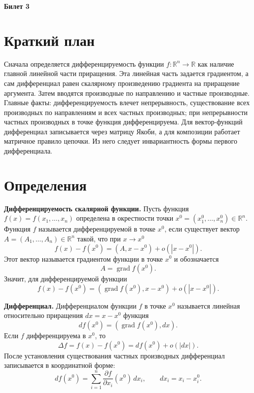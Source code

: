 \documentclass[12pt,a4paper]{article}
\newcommand{\R}{\mathbb{R}}
\newcommand{\grad}{\operatorname{grad}}
\begin{document}
\begin{center}
{\Large\bfseries Билет 3}
\end{center}

\noindent{}

\section*{Краткий план}

Сначала определяется дифференцируемость функции \(f:\R^n\to\R\) как наличие
главной линейной части приращения. Эта линейная часть задается градиентом, а
сам дифференциал равен скалярному произведению градиента на приращение
аргумента. Затем вводятся производные по направлению и частные производные.
Главные факты: дифференцируемость влечет непрерывность, существование всех
производных по направлениям и всех частных производных; при непрерывности
частных производных в точке функция дифференцируема. Для вектор-функций
дифференциал записывается через матрицу Якоби, а для композиции работает
матричное правило цепочки. Из него следует инвариантность формы первого
дифференциала.

\section*{Определения}

\textbf{Дифференцируемость скалярной функции.}
Пусть функция \(f(x)=f(x_1,\dots,x_n)\) определена в окрестности точки
\(x^0=(x^0_1,\dots,x^0_n)\in\R^n\). Функция \(f\) называется
дифференцируемой в точке \(x^0\), если существует вектор
\(A=(A_1,\dots,A_n)\in\R^n\) такой, что при \(x\to x^0\)
\[
  f(x)-f(x^0)=(A,x-x^0)+o(|x-x^0|).
\]
Этот вектор называется градиентом функции в точке \(x^0\) и обозначается
\[
  A=\grad f(x^0).
\]
Значит, для дифференцируемой функции
\[
  f(x)-f(x^0)=(\grad f(x^0),x-x^0)+o(|x-x^0|).
\]

\textbf{Дифференциал.}
Дифференциалом функции \(f\) в точке \(x^0\) называется линейная относительно
приращения \(dx=x-x^0\) функция
\[
  df(x^0)=(\grad f(x^0),dx).
\]
Если \(f\) дифференцируема в \(x^0\), то
\[
  \Delta f=f(x)-f(x^0)=df(x^0)+o(|dx|).
\]
После установления существования частных производных дифференциал записывается
в координатной форме:
\[
  df(x^0)=\sum_{i=1}^n \frac{\partial f}{\partial x_i}(x^0)\,dx_i,
  \qquad dx_i=x_i-x_i^0.
\]
\end{document}

